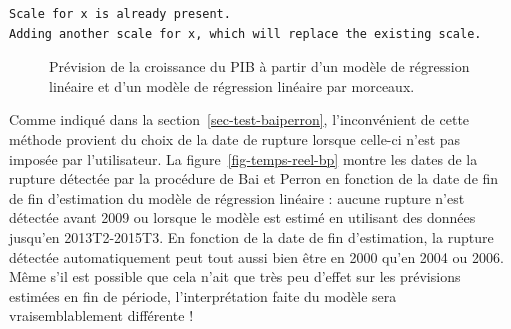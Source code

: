 \documentclass[
  a4paper,
  DIV=11,
  numbers=noendperiod,
  french]{scrartcl}
\newcommand\1{{\mathds 1}}
\theoremstyle{remark}
\begin{document}
\begin{verbatim}
Scale for x is already present.
Adding another scale for x, which will replace the existing scale.
\end{verbatim}

\begin{figure}

\caption{\label{fig-prev-piecereg}Prévision de la croissance du PIB à
partir d'un modèle de régression linéaire et d'un modèle de régression
linéaire par morceaux.}


\end{figure}%

Comme indiqué dans la section~\ref{sec-test-baiperron}, l'inconvénient
de cette méthode provient du choix de la date de rupture lorsque
celle-ci n'est pas imposée par l'utilisateur. La
figure~\ref{fig-temps-reel-bp} montre les dates de la rupture détectée
par la procédure de Bai et Perron en fonction de la date de fin de fin
d'estimation du modèle de régression linéaire : aucune rupture n'est
détectée avant 2009 ou lorsque le modèle est estimé en utilisant des
données jusqu'en 2013T2-2015T3. En fonction de la date de fin
d'estimation, la rupture détectée automatiquement peut tout aussi bien
être en 2000 qu'en 2004 ou 2006. Même s'il est possible que cela n'ait
que très peu d'effet sur les prévisions estimées en fin de période,
l'interprétation faite du modèle sera vraisemblablement différente !
\end{document}

